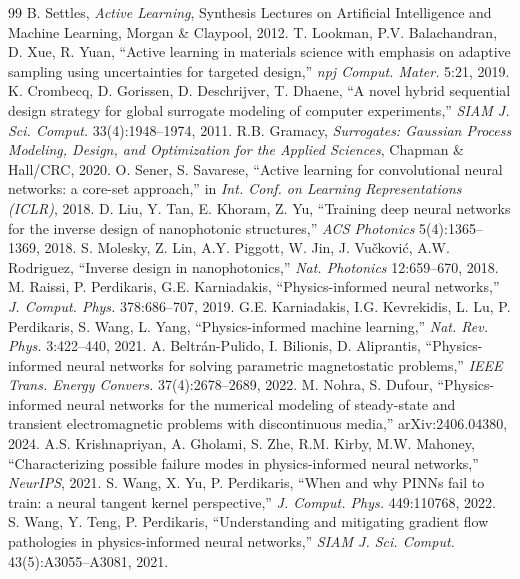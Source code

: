 \documentclass[11pt]{article}
\begin{document}
\begin{thebibliography}{99}
 B. Settles, \emph{Active Learning}, Synthesis Lectures on Artificial Intelligence and Machine Learning, Morgan \& Claypool, 2012.
 T. Lookman, P.V. Balachandran, D. Xue, R. Yuan, ``Active learning in materials science with emphasis on adaptive sampling using uncertainties for targeted design,'' \emph{npj Comput. Mater.} 5:21, 2019.
 K. Crombecq, D. Gorissen, D. Deschrijver, T. Dhaene, ``A novel hybrid sequential design strategy for global surrogate modeling of computer experiments,'' \emph{SIAM J. Sci. Comput.} 33(4):1948--1974, 2011.
 R.B. Gramacy, \emph{Surrogates: Gaussian Process Modeling, Design, and Optimization for the Applied Sciences}, Chapman \& Hall/CRC, 2020.
 O. Sener, S. Savarese, ``Active learning for convolutional neural networks: a core-set approach,'' in \emph{Int. Conf. on Learning Representations (ICLR)}, 2018.
 D. Liu, Y. Tan, E. Khoram, Z. Yu, ``Training deep neural networks for the inverse design of nanophotonic structures,'' \emph{ACS Photonics} 5(4):1365--1369, 2018.
 S. Molesky, Z. Lin, A.Y. Piggott, W. Jin, J. Vu\v{c}kovi\'c, A.W. Rodriguez, ``Inverse design in nanophotonics,'' \emph{Nat. Photonics} 12:659--670, 2018.
 M. Raissi, P. Perdikaris, G.E. Karniadakis, ``Physics-informed neural networks,'' \emph{J. Comput. Phys.} 378:686--707, 2019.
 G.E. Karniadakis, I.G. Kevrekidis, L. Lu, P. Perdikaris, S. Wang, L. Yang, ``Physics-informed machine learning,'' \emph{Nat. Rev. Phys.} 3:422--440, 2021.
 A. Beltr\'an-Pulido, I. Bilionis, D. Aliprantis, ``Physics-informed neural networks for solving parametric magnetostatic problems,'' \emph{IEEE Trans. Energy Convers.} 37(4):2678--2689, 2022.
 M. Nohra, S. Dufour, ``Physics-informed neural networks for the numerical modeling of steady-state and transient electromagnetic problems with discontinuous media,'' arXiv:2406.04380, 2024.
 A.S. Krishnapriyan, A. Gholami, S. Zhe, R.M. Kirby, M.W. Mahoney, ``Characterizing possible failure modes in physics-informed neural networks,'' \emph{NeurIPS}, 2021.
 S. Wang, X. Yu, P. Perdikaris, ``When and why PINNs fail to train: a neural tangent kernel perspective,'' \emph{J. Comput. Phys.} 449:110768, 2022.
 S. Wang, Y. Teng, P. Perdikaris, ``Understanding and mitigating gradient flow pathologies in physics-informed neural networks,'' \emph{SIAM J. Sci. Comput.} 43(5):A3055--A3081, 2021.

\end{thebibliography}
\end{document}
